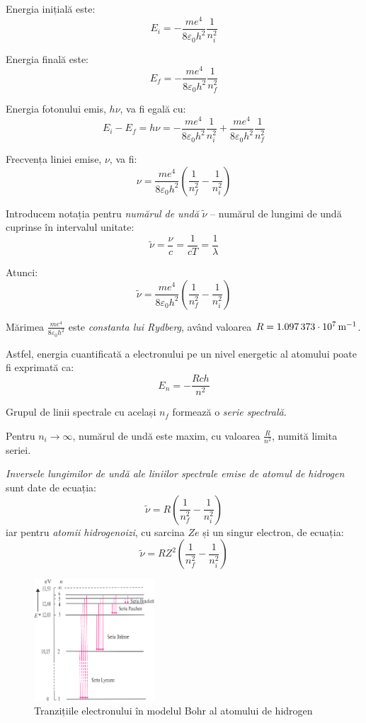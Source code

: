 Energia inițială este:
\[ E_i = -\frac{me^4}{8\varepsilon_0 h^2} \frac{1}{n_i^2} \]

Energia finală este:
\[ E_f = -\frac{me^4}{8\varepsilon_0 h^2} \frac{1}{n_f^2} \]

Energia fotonului emis, $h\nu$, va fi egală cu:
\[
    E_i - E_f = h\nu
    = -\frac{me^4}{8\varepsilon_0 h^2} \frac{1}{n_i^2}
    + \frac{me^4}{8\varepsilon_0 h^2} \frac{1}{n_f^2}
\]

Frecvența liniei emise, $\nu$, va fi:
\[
    \nu = \frac{me^4}{8\varepsilon_0 h^2}
    \left(\frac{1}{n_f^2} - \frac{1}{n_i^2}\right)
\]

Introducem notația pentru \emph{numărul de undă} $\tilde{\nu}$ -- numărul de
lungimi de undă cuprinse în intervalul unitate:
\[ \tilde{\nu} = \frac{\nu}{c} = \frac{1}{cT} = \frac{1}{\lambda} \]

Atunci:
\[
    \tilde{\nu} = \frac{me^4}{8\varepsilon_0 h^2}
    \left(\frac{1}{n_f^2} - \frac{1}{n_i^2}\right)
\]

Mărimea $\frac{me^4}{8\varepsilon_0 h^2}$ este \emph{constanta lui Rydberg},
având valoarea $R = \SI{1,097373d7}{\per\meter}$.

Astfel, energia cuantificată a electronului pe un nivel energetic al atomului
poate fi exprimată ca:
\[ \boxed{E_n = -\frac{Rch}{n^2}} \]

Grupul de linii spectrale cu același $n_f$ formează o \emph{serie spectrală}.

Pentru $n_i \rightarrow \infty$, numărul de undă este maxim, cu valoarea
$\frac{R}{n^2}$, numită limita seriei.

\emph{Inversele lungimilor de undă ale liniilor spectrale emise de atomul de
hidrogen} sunt date de ecuația:
\[ \tilde{\nu} = R \left(\frac{1}{n_f^2} - \frac{1}{n_i^2}\right) \]
iar pentru \emph{atomii hidrogenoizi}, cu sarcina $Ze$ și un singur electron,
de ecuația:
\[ \tilde{\nu} = RZ^2 \left(\frac{1}{n_f^2} - \frac{1}{n_i^2}\right) \]

\clearpage

\begin{figure}
    \centering
    \includegraphics[width=0.4\textwidth]{fig/tranzitii_electron}
    \caption{Tranzițiile electronului în modelul Bohr al atomului de hidrogen}
\end{figure}

